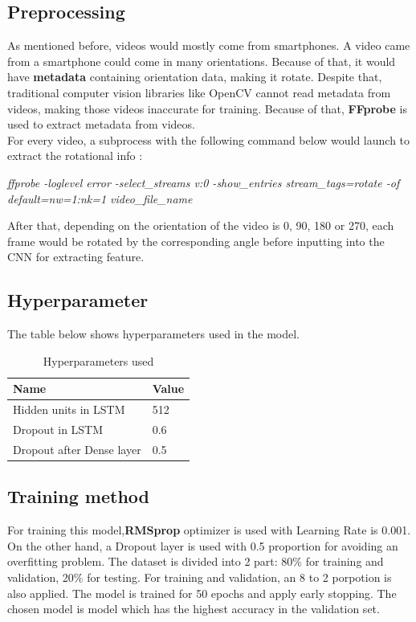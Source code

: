 \subsection{Preprocessing}
As mentioned before, videos would mostly come from smartphones. A video came from a smartphone could come in many orientations. Because of that, it would have \textbf{metadata} containing orientation data, making it rotate. Despite that, traditional computer vision libraries like OpenCV cannot read metadata from videos, making those videos inaccurate for training. Because of that, \textbf{FFprobe} is used to extract metadata from videos.\\
For every video, a subprocess with the following command below would launch to extract the rotational info :\\
\begin{center}
\textit{ffprobe -loglevel error -select\_streams v:0 -show\_entries stream\_tags=rotate -of  default=nw=1:nk=1 video\_file\_name}
\end{center}
After that, depending on the orientation of the video is 0, 90, 180 or 270, each frame would be rotated by the corresponding angle before inputting into the CNN for extracting feature. 
\subsection{Hyperparameter}
The table below shows hyperparameters used in the model.
\begin{table}[H]
	\begin{tabular}{|P{5cm}|L{5cm}|}
		\hline
		\textbf{Name}				&  \textbf{Value}
		\\ \hline
		Hidden units in LSTM		&   512
		\\ \hline
		Dropout	in LSTM				&  	0.6      
		\\ \hline
		Dropout after Dense layer	&	0.5
		\\ \hline
	\end{tabular}
\caption{Hyperparameters used}
\end{table}
\subsection{Training method}
For training this model,\textbf{RMSprop} optimizer is used \cite{} with Learning Rate is 0.001. On the other hand, a Dropout layer is used with 0.5 proportion for avoiding an overfitting problem. The dataset is divided into 2 part: 80\% for training and validation, 20\% for testing. For training and validation, an 8 to 2 porpotion is also applied. The model is trained for 50 epochs and apply early stopping. The chosen model is model which has the highest accuracy in the validation set.  

